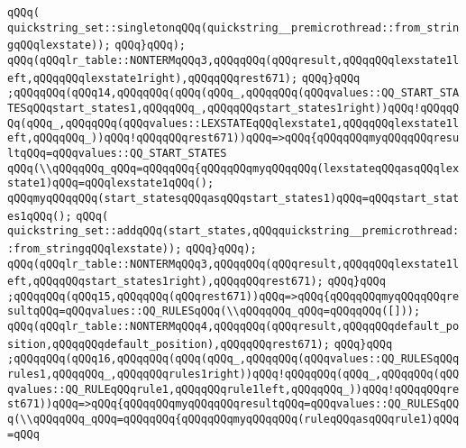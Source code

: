 \verb|qQQq(|\newline
\verb|quickstring_set::singletonqQQq(quickstring__premicrothread::from_stringqQQqlexstate));|\newline
\verb|qQQq}qQQq);|\newline
\verb|qQQq(qQQqlr_table::NONTERMqQQq3,qQQqqQQq(qQQqresult,qQQqqQQqlexstate1left,qQQqqQQqlexstate1right),qQQqqQQqrest671);|\newline
\verb|qQQq}qQQq|\newline
\verb|;qQQqqQQq(qQQq14,qQQqqQQq(qQQq(qQQq_,qQQqqQQq(qQQqvalues::QQ_START_STATESqQQqstart_states1,qQQqqQQq_,qQQqqQQqstart_states1right))qQQq!qQQqqQQq(qQQq_,qQQqqQQq(qQQqvalues::LEXSTATEqQQqlexstate1,qQQqqQQqlexstate1left,qQQqqQQq_))qQQq!qQQqqQQqrest671))qQQq=>qQQq{qQQqqQQqmyqQQqqQQqresultqQQq=qQQqvalues::QQ_START_STATES|\newline
\verb|qQQq(\\qQQqqQQq_qQQq=qQQqqQQq{qQQqqQQqmyqQQqqQQq(lexstateqQQqasqQQqlexstate1)qQQq=qQQqlexstate1qQQq();|\newline
\verb|qQQqmyqQQqqQQq(start_statesqQQqasqQQqstart_states1)qQQq=qQQqstart_states1qQQq();|\newline
\verb|qQQq(|\newline
\verb|quickstring_set::addqQQq(start_states,qQQqquickstring__premicrothread::from_stringqQQqlexstate));|\newline
\verb|qQQq}qQQq);|\newline
\verb|qQQq(qQQqlr_table::NONTERMqQQq3,qQQqqQQq(qQQqresult,qQQqqQQqlexstate1left,qQQqqQQqstart_states1right),qQQqqQQqrest671);|\newline
\verb|qQQq}qQQq|\newline
\verb|;qQQqqQQq(qQQq15,qQQqqQQq(qQQqrest671))qQQq=>qQQq{qQQqqQQqmyqQQqqQQqresultqQQq=qQQqvalues::QQ_RULESqQQq(\\qQQqqQQq_qQQq=qQQqqQQq([]));|\newline
\verb|qQQq(qQQqlr_table::NONTERMqQQq4,qQQqqQQq(qQQqresult,qQQqqQQqdefault_position,qQQqqQQqdefault_position),qQQqqQQqrest671);|\newline
\verb|qQQq}qQQq|\newline
\verb|;qQQqqQQq(qQQq16,qQQqqQQq(qQQq(qQQq_,qQQqqQQq(qQQqvalues::QQ_RULESqQQqrules1,qQQqqQQq_,qQQqqQQqrules1right))qQQq!qQQqqQQq(qQQq_,qQQqqQQq(qQQqvalues::QQ_RULEqQQqrule1,qQQqqQQqrule1left,qQQqqQQq_))qQQq!qQQqqQQqrest671))qQQq=>qQQq{qQQqqQQqmyqQQqqQQqresultqQQq=qQQqvalues::QQ_RULESqQQq(\\qQQqqQQq_qQQq=qQQqqQQq{qQQqqQQqmyqQQqqQQq(ruleqQQqasqQQqrule1)qQQq=qQQq|\newline
